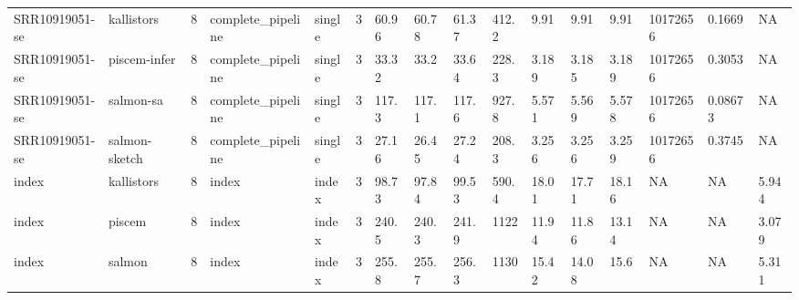 \begin{tabular}{llllllllllllllll}
SRR10919051-se & kallistors & 8 & complete\_pipeline & single & 3 & 60.96 & 60.78 & 61.37 & 412.2 & 9.91 & 9.91 & 9.91 & 10172656 & 0.1669 & NA \\
SRR10919051-se & piscem-infer & 8 & complete\_pipeline & single & 3 & 33.32 & 33.2 & 33.64 & 228.3 & 3.189 & 3.185 & 3.189 & 10172656 & 0.3053 & NA \\
SRR10919051-se & salmon-sa & 8 & complete\_pipeline & single & 3 & 117.3 & 117.1 & 117.6 & 927.8 & 5.571 & 5.569 & 5.578 & 10172656 & 0.08673 & NA \\
SRR10919051-se & salmon-sketch & 8 & complete\_pipeline & single & 3 & 27.16 & 26.45 & 27.24 & 208.3 & 3.256 & 3.256 & 3.259 & 10172656 & 0.3745 & NA \\
index & kallistors & 8 & index & index & 3 & 98.73 & 97.84 & 99.53 & 590.4 & 18.01 & 17.71 & 18.16 & NA & NA & 5.944 \\
index & piscem & 8 & index & index & 3 & 240.5 & 240.3 & 241.9 & 1122 & 11.94 & 11.86 & 13.14 & NA & NA & 3.079 \\
index & salmon & 8 & index & index & 3 & 255.8 & 255.7 & 256.3 & 1130 & 15.42 & 14.08 & 15.6 & NA & NA & 5.311 \\
\bottomrule
\end{tabular}
